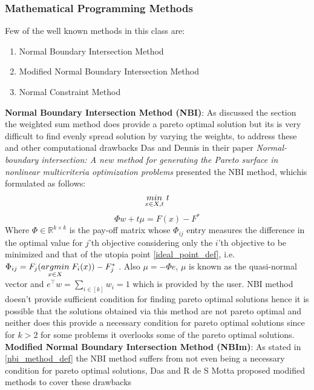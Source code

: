 \subsubsection{Mathematical Programming Methods}
Few of the well known methods in this class are:
\begin{enumerate}
    \item Normal Boundary Intersection Method
    \item Modified Normal Boundary Intersection Method
    \item Normal Constraint Method
\end{enumerate} 
\textbf{Normal Boundary Intersection Method (NBI)}: \label{nbi_method_def}
As discussed the section \label{lin_utility_model} the weighted sum method does provide a pareto optimal solution but its is very difficult to find evenly spread solution by varying the weights, to address these and other computational drawbacks Das and Dennis in their paper \textit{Normal-boundary intersection: A new method for generating the Pareto surface in nonlinear multicriteria optimization problems} \cite{das1998normal} presented the NBI method, whichis formulated as follows:
\begin{equation} \label{nbi_obj}
    \underset{x\in X, t}{min} \hspace{1mm} t
\end{equation}
\begin{equation}
    \Phi w + t \mu = F(x) - F^{*}
\end{equation}
Where $\Phi \in \mathbb{R}^{k\times k}$ is the pay-off matrix whose $\Phi_{ij}$ entry measures the difference in the optimal value for $j$'th objective considering only the $i$'th objective to be minimized and that of the utopia point \ref{ideal_point_def}, i.e. $\Phi_{ij} = F_j(\underset{x\in X}{argmin}\hspace{1mm} F_i(x))-F^{*}_j$ . Also $\mu = - \Phi e$, $\mu$ is known as the quasi-normal vector and $e^{\top}w=\sum_{i\in [k]} w_i = 1$ which is provided by the user. NBI method doesn't provide sufficient condition for finding pareto optimal solutions hence it is possible that the solutions obtained via this method are not pareto optimal and neither does this provide a necessary condition for pareto optimal solutions since for $k>2$ for some problems it overlooks some of the pareto optimal solutions.
\newline\newline \textbf{Modified Normal Boundary Intersection Method (NBIm)}: \label{nbim_method_def} As stated in \ref{nbi_method_def} the NBI method suffers from not even being a necessary condition for pareto optimal solutions, Das \cite{das1999improved} and R de S Motta \cite{de2012modified} proposed modified methods to cover these drawbacks
